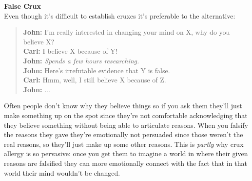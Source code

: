 \documentclass[12pt,english]{article}
\begin{document}
\par
\textbf{False Crux}\\
Even though it's difficult to establish cruxes it's preferable to the alternative:
\begin{quote}
    \textbf{John:} I'm really interested in changing your mind on X, why do you believe X?\\
    \textbf{Carl:} I believe X because of Y!\\
    \textbf{John:} \textit{Spends a few hours researching.}\\
    \textbf{John:} Here's irrefutable evidence that Y is false.\\
    \textbf{Carl:} Hmm, well, I still believe X because of Z.\\
    \textbf{John:} ...\\
\end{quote}
Often people don't know why they believe things so if you ask them they'll just make something up on the spot since they're not comfortable acknowledging that they believe something without being able to articulate reasons.
When you falsify the reasons they gave they're emotionally not persuaded since those weren't the real reasons, so they'll just make up some other reasons. This is \textit{partly} why crux allergy is so pervasive: once you get them to imagine a world in where their given reasons are falsified they can more emotionally connect with the fact that in that world their mind wouldn't be changed.
\par
\textbf{}\\
\end{document}
